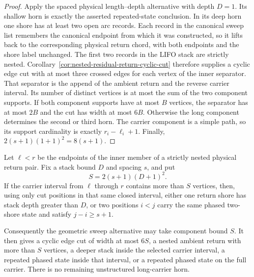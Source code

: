 \begin{proof}
Apply the spaced physical length--depth alternative with depth $D=1$.
Its shallow horn is exactly the asserted repeated-state conclusion.  In its
deep horn one shore has at least two open arc records.  Each record in the
canonical sweep list remembers the canonical endpoint from which it was
constructed, so it lifts back to the corresponding physical return chord,
with both endpoints and the shore label unchanged.  The first two records in
the LIFO stack are strictly nested.  Corollary~\ref{cor:nested-residual-return-cyclic-cut}
therefore supplies a cyclic edge cut with at most three crossed edges for
each vertex of the inner separator.  That separator is the append of the
ambient return and the reverse carrier interval.  Its number of distinct
vertices is at most the sum of the two component supports.  If both component
supports have at most $B$ vertices, the separator has at most $2B$ and the cut
has width at most $6B$.  Otherwise the long component determines the second or
third horn.  The carrier component is a simple path, so its support cardinality
is exactly $r_i-\ell_i+1$.  Finally, $2(s+1)(1+1)^2=8(s+1)$.
\end{proof}

\begin{corollary}
\label{cor:carrier-local-residual-return-compression}
Let $\ell<r$ be the endpoints of the inner member of a strictly nested
physical return pair.  Fix a stack bound $D$ and spacing $s$, and put
\[
                         S=2(s+1)(D+1)^2.
\]
If the carrier interval from $\ell$ through $r$ contains more than $S$
vertices, then, using only cut positions in that same closed interval,
either one return shore has stack depth greater than $D$, or two positions
$i<j$ carry the same phased two-shore state and satisfy $j-i\ge s+1$.

Consequently the geometric sweep alternative may take component bound $S$.
It then gives a cyclic edge cut of width at most $6S$, a nested ambient
return with more than $S$ vertices, a deeper stack inside the selected
carrier interval, a repeated phased state inside that interval, or a
repeated phased state on the full carrier.  There is no remaining
unstructured long-carrier horn.
\end{corollary}

